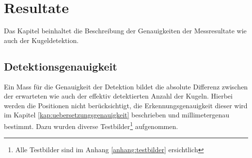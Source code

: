 \chapter{Resultate}\label{kap:resultate}
Das Kapitel beinhaltet die Beschreibung der Genauigkeiten der Messresultate wie auch der Kugeldetektion.

\section{Detektionsgenauigkeit}
Ein Mass für die Genauigkeit der Detektion bildet die absolute Differenz zwischen der erwarteten wie auch der
effektiv detektierten Anzahl der Kugeln. Hierbei werden die Positionen nicht berücksichtigt, die Erkennungsgenauigkeit dieser
wird im Kapitel \ref{kap:uebersetzungsgenauigkeit} beschrieben und millimetergenau bestimmt.
Dazu wurden diverse Testbilder\footnote{Alle Testbilder sind im Anhang \ref{anhang:testbilder} ersichtlich} aufgenommen.

